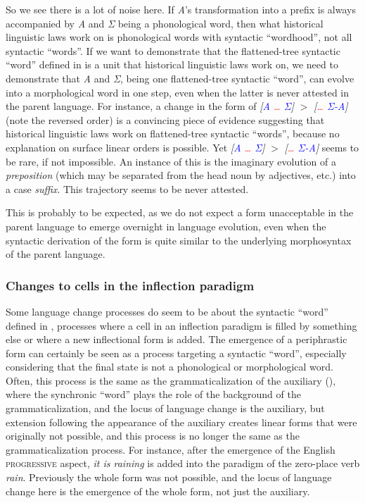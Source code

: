 \documentclass[a4paper, oneside, scheme=plain, 12pt]{article}
\newcommand{\form}[1]{\emph{#1}}
\newcommand*{\textgt}{$>$ }
\newcommand*{\category}[1]{\textsc{#1}}
\begin{document}
So we see there is a lot of noise here.
If \form{A}'s transformation into a prefix is always accompanied by \form{A} and \form{Σ} being a phonological word,
then what historical linguistic laws work on is phonological words with syntactic ``wordhood'',
not all syntactic ``words''.
If we want to demonstrate that the flattened-tree syntactic ``word'' defined in 
is a unit that historical linguistic laws work on,
we need to demonstrate that \form{A} and \form{Σ}, being one flattened-tree syntactic ``word'', can evolve into a morphological word in one step,
even when the latter is never attested in the parent language.
For instance, a change in the form of \form{[\textcolor{blue}{A} \textcolor{red}{\dots} \textcolor{blue}{Σ}]} \textgt \form{[\textcolor{red}{\dots} \textcolor{blue}{Σ-A}]} (note the reversed order)
is a convincing piece of evidence suggesting that historical linguistic laws work on flattened-tree syntactic ``words'',
because no explanation on surface linear orders is possible.
Yet \form{[\textcolor{blue}{A} \textcolor{red}{\dots} \textcolor{blue}{Σ}]} \textgt \form{[\textcolor{red}{\dots} \textcolor{blue}{Σ-A}]} seems to be rare, if not impossible.
An instance of this is the imaginary evolution of a \emph{preposition} (which may be separated from the head noun by adjectives, etc.) into a case \emph{suffix}.
This trajectory seems to be never attested.

This is probably to be expected, as we do not expect a form unacceptable in the parent language to emerge overnight in language evolution,
even when the syntactic derivation of the form is quite similar to the underlying morphosyntax of the parent language.


\subsubsection{Changes to cells in the inflection paradigm}\label{sec:new-inflection-cell}

Some language change processes do seem to be about the syntactic ``word'' defined in ,
processes where a cell in an inflection paradigm is filled by something else
or where a new inflectional form is added.
The emergence of a periphrastic form can certainly be seen as 
a process targeting a syntactic ``word'',
especially considering that the final state is not a phonological or morphological word.
Often, this process is the same as the grammaticalization of the auxiliary
(),
where the synchronic ``word'' plays the role of the background of the grammaticalization,
and the locus of language change is the auxiliary,
but extension following the appearance of the auxiliary creates linear forms
that were originally not possible,
and this process is no longer the same as the grammaticalization process.
For instance, after the emergence of the English \category{progressive} aspect,
\form{it is raining} is added into the paradigm of the zero-place verb \form{rain}.
Previously the whole form was not possible,
and the locus of language change here is the emergence of the whole form,
not just the auxiliary.
\end{document}
